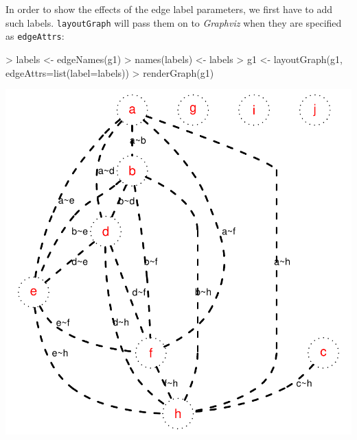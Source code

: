 \documentclass{article}
\newcommand{\Rfunction}[1]{{\texttt{#1}}}
\newcommand{\Robject}[1]{{\texttt{#1}}}
\begin{document}
In order to show the effects of the edge label parameters, we first
have to add such labels. \Rfunction{layoutGraph} will pass them on to
\textit{Graphviz} when they are specified as \Robject{edgeAttrs}:
\begin{Schunk}
\begin{Sinput}
> labels <- edgeNames(g1)
> names(labels) <- labels
> g1 <- layoutGraph(g1, edgeAttrs=list(label=labels))
> renderGraph(g1)
\end{Sinput}
\end{Schunk}
\includegraphics{newRgraphvizInterface-labels}
\end{document}

